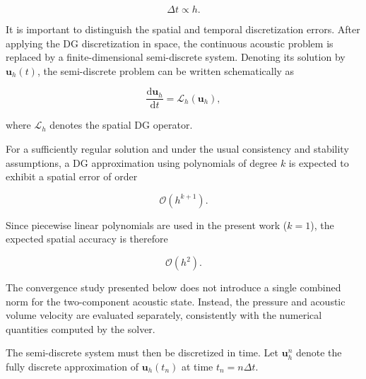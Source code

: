 \documentclass[11pt,a4paper]{report}
\theoremstyle{plain}
\theoremstyle{definition}
\begin{document}
\begin{equation}
\Delta t \propto h.
\label{eq:cfl_validation}
\end{equation}


It is important to distinguish the spatial and temporal discretization errors.
After applying the DG discretization in space, the continuous acoustic problem
is replaced by a finite-dimensional semi-discrete system. Denoting its solution
by \(\mathbf{u}_h(t)\), the semi-discrete problem can be written schematically as

\begin{equation}
\frac{\mathrm d \mathbf{u}_h}{\mathrm dt}
=
\mathcal{L}_h(\mathbf{u}_h),
\end{equation}

where \(\mathcal{L}_h\) denotes the spatial DG operator.

For a sufficiently regular solution and under the usual consistency and
stability assumptions, a DG approximation using polynomials of degree \(k\)
is expected to exhibit a spatial error of order

\begin{equation}
\mathcal{O}(h^{k+1}).
\end{equation}

Since piecewise linear polynomials are used in the present work
(\(k=1\)), the expected spatial accuracy is therefore

\begin{equation}
\boxed{
\mathcal{O}(h^2).
}
\label{eq:space_order}
\end{equation}

The convergence study presented below does not introduce a single combined norm
for the two-component acoustic state. Instead, the pressure and acoustic volume
velocity are evaluated separately, consistently with the numerical quantities
computed by the solver.


The semi-discrete system must then be discretized in time. Let
\(\mathbf{u}_h^n\) denote the fully discrete approximation of
\(\mathbf{u}_h(t_n)\) at time \(t_n=n\Delta t\).
\end{document}
